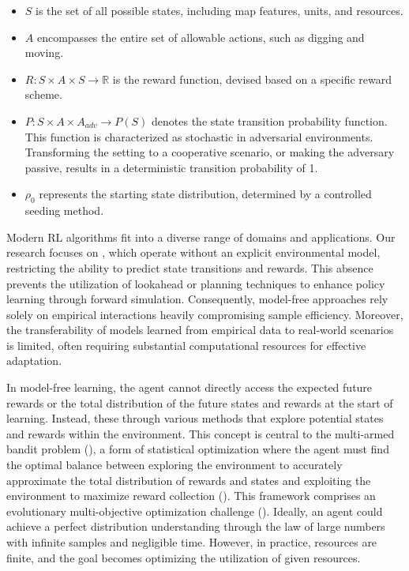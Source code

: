     \begin{itemize}[itemsep=4pt, parsep=0pt]
        \item $S$ is the set of all possible states, including map features, units, and resources.
        \item $A$ encompasses the entire set of allowable actions, such as digging and moving.
        \item $R : S \times A \times S \rightarrow \mathbb{R}$ is the reward function, devised based on a specific reward scheme.
        \item $P : S \times A \times A_{adv} \rightarrow P(S)$ denotes the state transition probability function. This function is characterized as stochastic in adversarial environments. Transforming the setting to a cooperative scenario, or making the adversary passive, results in a deterministic transition probability of 1.
        \item $\rho_0$ represents the starting state distribution, determined by a controlled seeding method.
    \end{itemize}
    
    \noindent Modern RL algorithms fit into a diverse range of domains and applications. Our research focuses on , which operate without an explicit environmental model, restricting the ability to predict state transitions and rewards. This absence prevents the utilization of lookahead or planning techniques to enhance policy learning through forward simulation. Consequently, model-free approaches rely solely on empirical interactions heavily compromising sample efficiency. Moreover, the transferability of models learned from empirical data to real-world scenarios is limited, often requiring substantial computational resources for effective adaptation. 
    
    \bigskip
    
    \noindent In model-free learning, the agent cannot directly access the expected future rewards or the total distribution of the future states and rewards at the start of learning. Instead, these  through various methods that explore potential states and rewards within the environment. This concept is central to the multi-armed bandit problem (\cite{Sutton1998}), a form of statistical optimization where the agent must find the optimal balance between exploring the environment to accurately approximate the total distribution of rewards and states and exploiting the environment to maximize reward collection (\cite{Lorincz}). This framework comprises an evolutionary multi-objective optimization challenge (\cite{Zitzler2012}). Ideally, an agent could achieve a perfect distribution understanding through the law of large numbers with infinite samples and negligible time. However, in practice, resources are finite, and the goal becomes optimizing the utilization of given resources.
    
